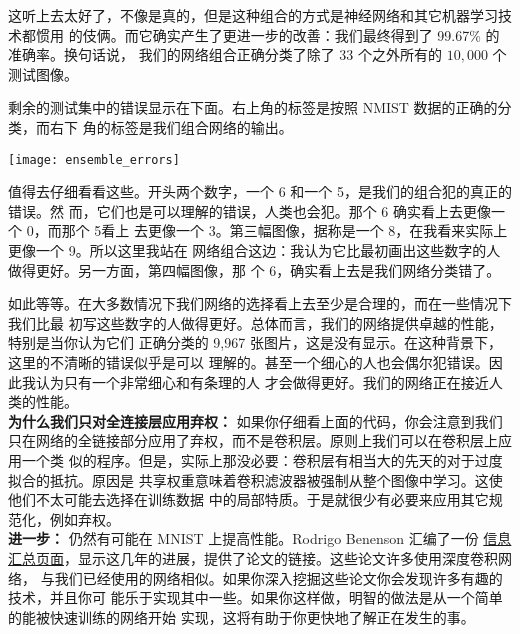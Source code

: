 这听上去太好了，不像是真的，但是这种组合的方式是神经网络和其它机器学习技术都惯用
的伎俩。而它确实产生了更进一步的改善：我们最终得到了 99.67\% 的准确率。换句话说，
我们的网络组合正确分类了除了 $33$ 个之外所有的 $10,000$ 个测试图像。

剩余的测试集中的错误显示在下面。右上角的标签是按照 NMIST 数据的正确的分类，而右下
角的标签是我们组合网络的输出。
\begin{center}
  \texttt{[image: ensemble\_errors]}
\end{center}

值得去仔细看看这些。开头两个数字，一个 6 和一个 5，是我们的组合犯的真正的错误。然
而，它们也是可以理解的错误，人类也会犯。那个 6 确实看上去更像一个 0，而那个 5看上
去更像一个 3。第三幅图像，据称是一个 8，在我看来实际上更像一个 9。所以这里我站在
网络组合这边：我认为它比最初画出这些数字的人做得更好。另一方面，第四幅图像，那
个 6，确实看上去是我们网络分类错了。

如此等等。在大多数情况下我们网络的选择看上去至少是合理的，而在一些情况下我们比最
初写这些数字的人做得更好。总体而言，我们的网络提供卓越的性能，特别是当你认为它们
正确分类的 9,967 张图片，这是没有显示。在这种背景下，这里的不清晰的错误似乎是可以
理解的。甚至一个细心的人也会偶尔犯错误。因此我认为只有一个非常细心和有条理的人
才会做得更好。我们的网络正在接近人类的性能。\\

\textbf{为什么我们只对全连接层应用弃权：} 如果你仔细看上面的代码，你会注意到我们
只在网络的全链接部分应用了弃权，而不是卷积层。原则上我们可以在卷积层上应用一个类
似的程序。但是，实际上那没必要：卷积层有相当大的先天的对于过度拟合的抵抗。原因是
共享权重意味着卷积滤波器被强制从整个图像中学习。这使他们不太可能去选择在训练数据
中的局部特质。于是就很少有必要来应用其它规范化，例如弃权。\\

\textbf{进一步：} 仍然有可能在 MNIST 上提高性能。Rodrigo Benenson 汇编了一份%
\href{http://rodrigob.github.io/are_we_there_yet/build/classification_datasets_results.html}{%
  信息汇总页面}，显示这几年的进展，提供了论文的链接。这些论文许多使用深度卷积网络，
与我们已经使用的网络相似。如果你深入挖掘这些论文你会发现许多有趣的技术，并且你可
能乐于实现其中一些。如果你这样做，明智的做法是从一个简单的能被快速训练的网络开始
实现，这将有助于你更快地了解正在发生的事。

